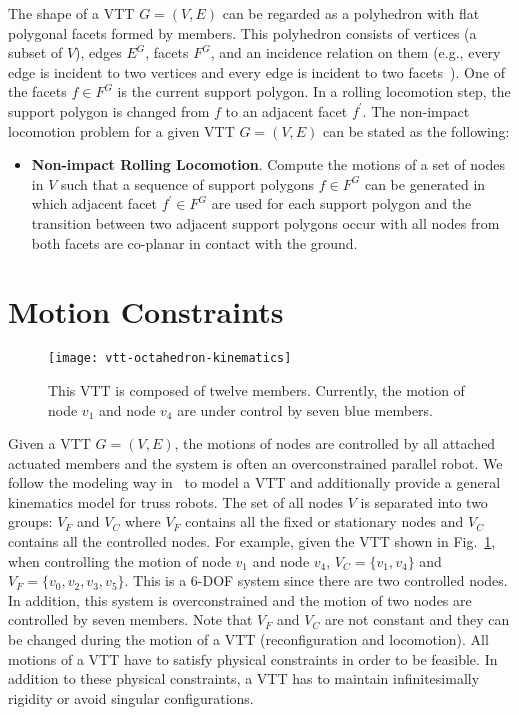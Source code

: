 \documentclass[journal]{IEEEtran}
\begin{document}
The shape of a VTT $G=(V,E)$ can be regarded as a polyhedron with flat
polygonal facets formed by members. This polyhedron consists of
vertices (a subset of $V$), edges $E^G$, facets $F^G$, and an
incidence relation on them (e.g., every edge is incident to two
vertices and every edge is incident to two
facets~\cite{Kettner-polyhedron-data-structure-1999}). One of the
facets $f\in F^G$ is the current support polygon. In a rolling
locomotion step, the support polygon is changed from $f$ to an
adjacent facet $f^{\prime}$. The non-impact locomotion problem for a
given VTT $G=(V,E)$ can be stated as the following:
\begin{itemize}
\item \textbf{Non-impact Rolling Locomotion}. Compute the motions of a
  set of nodes in $V$ such that a sequence of support polygons
  $f\in F^G$ can be generated in which adjacent facet
  $f^{\prime}\in F^G$ are used for each support polygon and the
  transition between two adjacent support polygons occur with all
  nodes from both facets are co-planar in contact with the ground.
\end{itemize}

\section{Motion Constraints}
\label{sec:kinematics-constraints}

\begin{figure}[t]
  \centering
  \texttt{[image: vtt-octahedron-kinematics]}
  \caption{This VTT is composed of twelve members. Currently, the
    motion of node $v_1$ and node $v_4$ are under control by seven
    blue members.}
  \label{fig:vtt-octahedron}
\end{figure}

Given a VTT $G=(V, E)$, the motions of nodes are controlled by all
attached actuated members and the system is often an overconstrained
parallel robot. We follow the modeling way
in~\cite{Hamlin-tetrobot-ram-1997} to model a VTT and additionally
provide a general kinematics model for truss robots. The set of all
nodes $V$ is separated into two groups: $V_F$ and $V_C$ where $V_F$
contains all the fixed or stationary nodes and $V_C$ contains all the
controlled nodes. For example, given the VTT shown in
Fig.~\ref{fig:vtt-octahedron}, when controlling the motion of node
$v_1$ and node $v_4$, $V_C=\{v_1, v_4\}$ and
$V_F=\{v_0, v_2, v_3, v_5\}$. This is a 6-DOF system since there are
two controlled nodes. In addition, this system is overconstrained and
the motion of two nodes are controlled by seven members. Note that
$V_F$ and $V_C$ are not constant and they can be changed during the
motion of a VTT (reconfiguration and locomotion). All motions of a VTT
have to satisfy physical constraints in order to be feasible. In
addition to these physical constraints, a VTT has to maintain
infinitesimally rigidity or avoid singular configurations.
\end{document}
